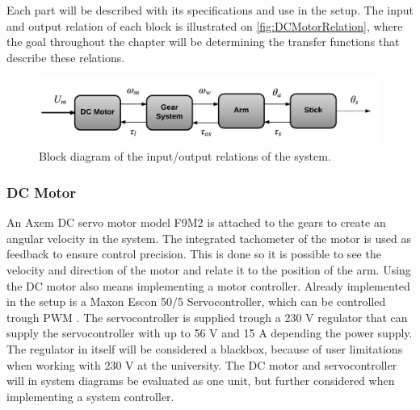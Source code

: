 Each part will be described with its specifications and use in the setup. The input and output relation of each block is illustrated on \autoref{fig:DCMotorRelation}, where the goal throughout the chapter will be determining the transfer functions that describe these relations.

\begin{figure} [htbp]
	\centering
	\includegraphics[width=\textwidth]{figures/modeling/InputOutputSystem.pdf}
	\caption{Block diagram of the input/output relations of the system.} \label{fig:DCMotorRelation}
\end{figure}
\startexplain
\stopexplain

\subsubsection{DC Motor}\label{DCMotor}
An Axem DC servo motor model F9M2 is attached to the gears to create an angular velocity in the system. The integrated tachometer of the motor is used as feedback to ensure control precision. This is done so it is possible to see the velocity and direction of the motor and relate it to the position of the arm. Using the DC motor also means implementing a motor controller. Already implemented in the setup is a Maxon Escon 50/5 Servocontroller, which can be controlled trough PWM \cite{datasheet:maxon}. The servocontroller is supplied trough a 230 V regulator that can supply the servocontroller with up to 56 V and 15 A depending the power supply. The regulator in itself will be considered a blackbox, because of user limitations when working with 230 V at the university. The DC motor and servocontroller will in system diagrams be evaluated as one unit, but further considered when implementing a system controller. 

